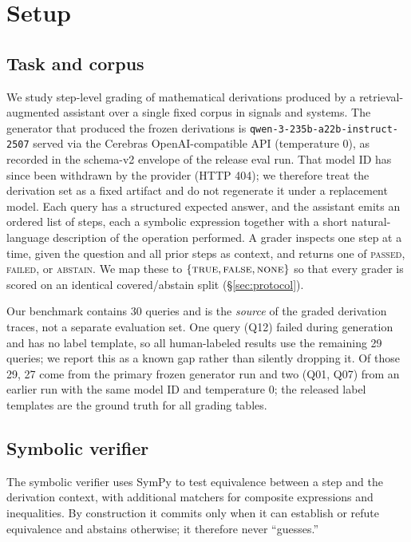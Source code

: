 \section{Setup}
\label{sec:setup}

\subsection{Task and corpus}
We study step-level grading of mathematical derivations produced by a
retrieval-augmented \citep{lewis2020rag} assistant over a single fixed corpus in
signals and systems. The generator that produced the frozen derivations is
\texttt{qwen-3-235b-a22b-instruct-2507} served via the Cerebras OpenAI-compatible
API (temperature $0$), as recorded in the schema-v2 envelope of the release
eval run. That model ID has since been withdrawn by the provider (HTTP 404);
we therefore treat the derivation set as a fixed artifact and do not regenerate
it under a replacement model.
Each query has a structured expected answer, and the assistant emits an ordered
list of steps, each a symbolic expression together with a short natural-language
description of the operation performed. A grader inspects one step at a time,
given the question and all prior steps as context, and returns one of
\textsc{passed}, \textsc{failed}, or \textsc{abstain}. We map these to
$\{\textsc{true}, \textsc{false}, \textsc{none}\}$ so that every grader is scored
on an identical covered/abstain split (\S\ref{sec:protocol}).

Our benchmark contains 30 queries and is the \emph{source} of the graded
derivation traces, not a separate evaluation set. One query (Q12) failed during
generation and has no label template, so all human-labeled results use the
remaining 29 queries; we report this as a known gap rather than silently
dropping it. Of those 29, 27 come from the primary frozen generator run and two
(Q01, Q07) from an earlier run with the same model ID and temperature $0$; the
released label templates are the ground truth for all grading tables.

\subsection{Symbolic verifier}
The symbolic verifier uses SymPy \citep{meurer2017sympy} to test equivalence
between a step and the derivation context, with additional matchers for composite
expressions and inequalities. By construction it commits only when it can
establish or refute equivalence and abstains otherwise; it therefore never
``guesses.''

